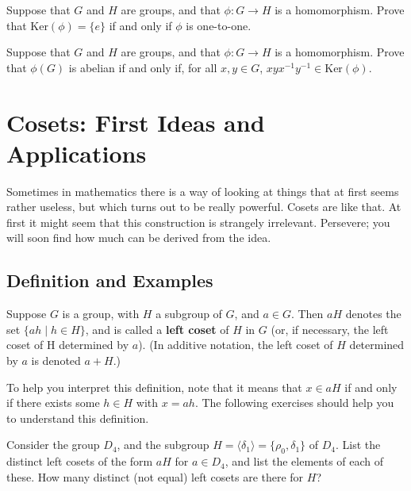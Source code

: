 \begin{problem}\label{prob:kerneltest}
Suppose that \(G\) and \(H\) are groups, and that \(\phi : G \longrightarrow H\) is a homomorphism. Prove that \(\mbox{Ker}(\phi) = \{e\}\) if and only if \(\phi\) is one-to-one.
\begin{annotation}
\end{annotation}
\end{problem}

\begin{problem}
Suppose that \(G\) and \(H\) are groups, and that \(\phi : G \longrightarrow H\) is a homomorphism. Prove that \(\phi(G)\) is abelian if and only if, for all \(x,y\in G\), \(xyx^{-1}y^{-1} \in \mbox{Ker}(\phi) \).
\end{problem}

\chapter{Cosets: First Ideas and Applications}

Sometimes in mathematics there is a way of looking at things that at first seems rather useless, but which turns out to be really powerful. Cosets are like that. At first it might seem that this construction is strangely irrelevant. Persevere; you will soon find how much can be derived from the idea.

\section{Definition and Examples}

\begin{definition}
Suppose \(G\) is a group, with \(H\) a subgroup of \(G\), and \( a \in G\).  Then \(aH\) denotes the set \(\{ah \mid h \in H\}\), and is called a \textbf{left coset} of \(H\) in \(G\) (or, if necessary, the left coset of H determined by \(a\)).
(In additive notation, the left coset of \(H\) determined by \(a\) is denoted \(a+H\).)
\end{definition}

To help you interpret this definition, note that it means that \(x \in aH \) if and only if there exists some \(h \in H\) with \(x = ah\).
The following exercises should help you to understand this definition.

\begin{problem}
Consider the group \(D_4\), and the subgroup \(H = \langle \delta_1 \rangle = \{\rho_0,\delta_1\} \) of \(D_4\). List the distinct left cosets of the form \(aH\) for \(a \in D_4\), and list the elements of each of these. How many distinct (not equal) left cosets are there for \(H\)?
\end{problem}

